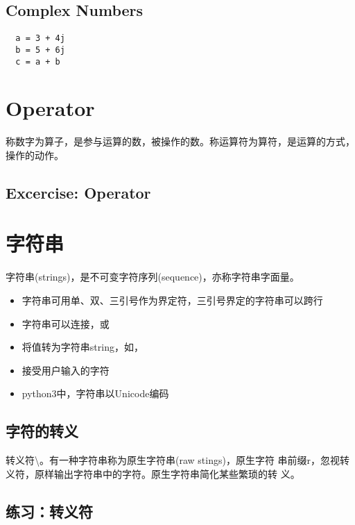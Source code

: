 \subsection{Complex Numbers}
\begin{framed}
\begin{verbatim}
  a = 3 + 4j
  b = 5 + 6j
  c = a + b
\end{verbatim}
\end{framed}
\section{Operator}
称数字为算子，是参与运算的数，被操作的数。称运算符为算符，是运算的方式，操作的动作。
\subsection{Excercise: Operator}
\section{字符串}
字符串(strings)，是不可变字符序列(sequence)，亦称字符串字面量。
\begin{itemize}
\item 字符串可用单、双、三引号作为界定符，三引号界定的字符串可以跨行
\item 字符串可以连接，或
\item {}将值转为字符串string，如，
\item {}接受用户输入的字符
\item  python3中，字符串以Unicode编码
\end{itemize}

\subsection{字符的转义}
转义符\textbackslash。有一种字符串称为原生字符串(raw stings)，原生字符
串前缀r，忽视转义符，原样输出字符串中的字符。原生字符串简化某些繁琐的转
义。
\subsection{练习：转义符}
  

